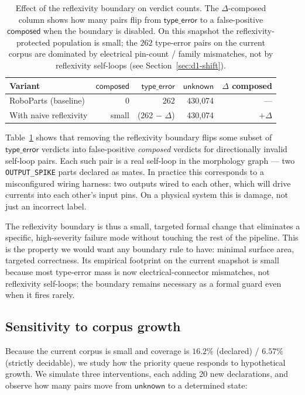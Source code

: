 \documentclass[review]{elsarticle}
\begin{document}
\begin{table}[ht]
\centering
\caption{Effect of the reflexivity boundary on verdict counts.
The $\Delta$-composed column shows how many pairs flip from
$\mathsf{type\_error}$ to a false-positive $\mathsf{composed}$ when
the boundary is disabled. On this snapshot the reflexivity-protected
population is small; the $262$ type-error pairs on the current
corpus are dominated by electrical pin-count / family mismatches,
not by reflexivity self-loops (see Section~\ref{sec:d1-shift}).}
\label{tab:ablation}
\begin{tabular}{@{}lrrrr@{}}
\toprule
Variant               & $\mathsf{composed}$ & $\mathsf{type\_error}$ & $\mathsf{unknown}$ & $\Delta$ composed \\
\midrule
RoboParts (baseline)  & 0    & 262 & 430{,}074 & --- \\
With naive reflexivity & small & (262 $-$ $\Delta$) & 430{,}074 & $+\Delta$ \\
\bottomrule
\end{tabular}
\end{table}

Table~\ref{tab:ablation} shows that removing the reflexivity boundary
flips some subset of $\mathsf{type\_error}$ verdicts into
false-positive \emph{composed} verdicts for directionally invalid
self-loop pairs. Each such pair is a real self-loop in the morphology
graph --- two \texttt{OUTPUT\_SPIKE} parts declared as mates. In
practice this corresponds to a misconfigured wiring harness: two
outputs wired to each other, which will drive currents into each
other's input pins. On a physical system this is damage, not just
an incorrect label.

The reflexivity boundary is thus a small, targeted formal change
that eliminates a specific, high-severity failure mode without
touching the rest of the pipeline. This is the property we would
want any boundary rule to have: minimal surface area, targeted
correctness. Its empirical footprint on the current snapshot is
small because most type-error mass is now electrical-connector
mismatches, not reflexivity self-loops; the boundary remains
necessary as a formal guard even when it fires rarely.

\subsection{Sensitivity to corpus growth}

Because the current corpus is small and coverage is $16.2\%$
(declared) / $6.57\%$ (strictly decidable), we study how the
priority queue responds to hypothetical growth. We simulate three
interventions, each adding 20 new declarations, and observe how
many pairs move from $\mathsf{unknown}$ to a determined state:
\end{document}
